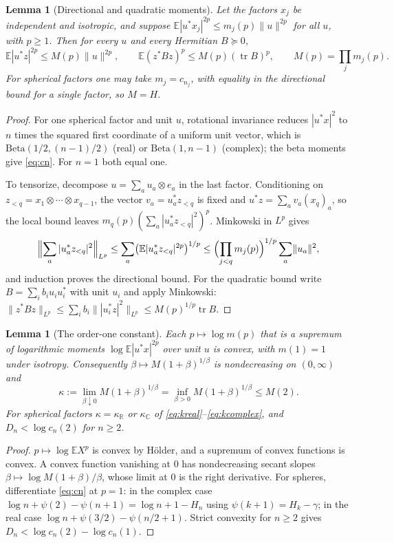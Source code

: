 \documentclass[11pt,a4paper]{article}
\newtheorem{lemma}[theorem]{Lemma}
\theoremstyle{definition}\newtheorem{definition}[theorem]{Definition}
\theoremstyle{remark}\newtheorem{remark}[theorem]{Remark}
\numberwithin{equation}{section}
\newcommand{\E}{\mathbb E}
\newcommand{\R}{\mathbb R}
\newcommand{\C}{\mathbb C}
\newcommand{\tr}{\operatorname{tr}}
\newcommand{\norm}[1]{\lVert#1\rVert}
\begin{document}
\begin{lemma}[Directional and quadratic moments]\label{lem:moments}
Let the factors $x_j$ be independent and isotropic, and suppose
$\E|u^*x_j|^{2p}\le m_j(p)\norm u^{2p}$ for all $u$, with $p\ge1$. Then for
every $u$ and every Hermitian $B\succeq0$,
\begin{equation}\label{eq:tensor-moments}
 \E|u^*z|^{2p}\le M(p)\norm u^{2p},\qquad \E(z^*Bz)^p\le M(p)(\tr B)^p,
 \qquad M(p)=\prod_jm_j(p).
\end{equation}
For spherical factors one may take $m_j=c_{n_j}$, with equality in the
directional bound for a single factor, so $M=H$.
\end{lemma}
\begin{proof}
For one spherical factor and unit $u$, rotational invariance reduces
$|u^*x|^2$ to $n$ times the squared first coordinate of a uniform unit vector,
which is $\mathrm{Beta}(1/2,(n-1)/2)$ (real) or $\mathrm{Beta}(1,n-1)$ (complex);
the beta moments give \eqref{eq:cn}. For $n=1$ both equal one.

To tensorize, decompose $u=\sum_au_a\otimes e_a$ in the last factor. Conditioning on
$z_{<q}=x_1\otimes\cdots\otimes x_{q-1}$, the vector $v_a=u_a^*z_{<q}$ is fixed and
$u^*z=\sum_a v_a(x_q)_a$, so the local bound leaves
$m_q(p)(\sum_a|u_a^*z_{<q}|^2)^p$. Minkowski in $L^p$ gives
\[
 \Bigl\|\sum_a|u_a^*z_{<q}|^2\Bigr\|_{L^p}
 \le\sum_a\bigl(\E|u_a^*z_{<q}|^{2p}\bigr)^{1/p}
 \le\Bigl(\prod_{j<q}m_j(p)\Bigr)^{1/p}\sum_a\norm{u_a}^2,
\]
and induction proves the directional bound. For the quadratic bound write
$B=\sum_ib_iu_iu_i^*$ with unit $u_i$ and apply Minkowski:
$\norm{z^*Bz}_{L^p}\le\sum_ib_i\norm{|u_i^*z|^2}_{L^p}\le M(p)^{1/p}\tr B$.
\end{proof}

\begin{lemma}[The order-one constant]\label{lem:slope}
Each $p\mapsto\log m(p)$ that is a supremum of logarithmic moments
$\log\E|u^*x|^{2p}$ over unit $u$ is convex, with $m(1)=1$ under isotropy.
Consequently $\beta\mapsto M(1+\beta)^{1/\beta}$ is nondecreasing on $(0,\infty)$ and
\[
 \kappa:=\lim_{\beta\downarrow0}M(1+\beta)^{1/\beta}=\inf_{\beta>0}M(1+\beta)^{1/\beta}\le M(2).
\]
For spherical factors $\kappa=\kappa_{\R}$ or $\kappa_{\C}$ of
\eqref{eq:kreal}--\eqref{eq:kcomplex}, and $D_n<\log c_n(2)$ for $n\ge2$.
\end{lemma}
\begin{proof}
$p\mapsto\log\E X^p$ is convex by H\"older, and a supremum of convex functions
is convex. A convex function vanishing at $0$ has nondecreasing secant slopes
$\beta\mapsto\log M(1+\beta)/\beta$, whose limit at $0$ is the right derivative.
For spheres, differentiate \eqref{eq:cn} at $p=1$: in the complex case
$\log n+\psi(2)-\psi(n+1)=\log n+1-H_n$ using $\psi(k+1)=H_k-\gamma$; in the
real case $\log n+\psi(3/2)-\psi(n/2+1)$. Strict convexity for $n\ge2$ gives
$D_n<\log c_n(2)-\log c_n(1)$.
\end{proof}
\end{document}

